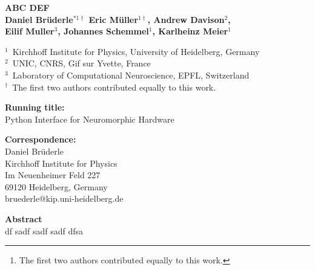 \documentclass[10pt,a4paper]{scrartcl}
\title{\greatTitle}
\author{
\bf{Daniel Br\"uderle$^{1*}$ Eric M\"uller$^{1}$\thanks{The first two authors contributed equally to this work.},} \\ 
\and Andrew Davison$^{2}$, Eilif Muller$^{3}$,\\ 
Johannes Schemmel$^{1}$, Karlheinz Meier$^{1}$\\
\vspace{5pt}\\
$^{1}$Kirchhoff Institute for Physics, University of Heidelberg, Germany\\
$^{2}$Unite de Neurosciences Integratives et Computationelles,\\
CNRS, Gif sur Yvette, France\\
$^{3}$Laboratory of Computational Neuroscience, \\
Ecoles Polytechniques Federales de Lausanne, Switzerland
}
\newcommand{\greatTitle}{ABC DEF}
\begin{document}
\rm

\begin{center}
	{\bf \Large \greatTitle}\\
\vspace{20pt}
{\bf Daniel Br\"uderle$^{*1\dagger}$ Eric M\"uller$^{1\dagger}$, Andrew Davison$^{2}$,\\ 
Eilif Muller$^{3}$, Johannes Schemmel$^{1}$, Karlheinz Meier$^{1}$}\\
\end{center}
\begin{flushleft}
$^{1}$~Kirchhoff Institute for Physics, University of Heidelberg, Germany\\
$^{2}$~UNIC, CNRS, Gif sur Yvette, France\\  %
$^{3}$~Laboratory of Computational Neuroscience, EPFL, Switzerland\\
$^{\dagger}$~The first two authors contributed equally to this work.
\end{flushleft}
\vspace{15pt}

{\bf \noindent Running title:}\\
Python Interface for Neuromorphic Hardware\\
\vspace{10pt}

{\bf \noindent Correspondence:}\\
Daniel Br\"uderle\\
Kirchhoff Institute for Physics\\
Im Neuenheimer Feld 227\\
69120 Heidelberg, Germany\\
bruederle@kip.uni-heidelberg.de\\
\vspace{20pt}



{\bf \large \noindent Abstract}\\

\noindent df sadf sadf sadf dfsa\\

\end{document}
